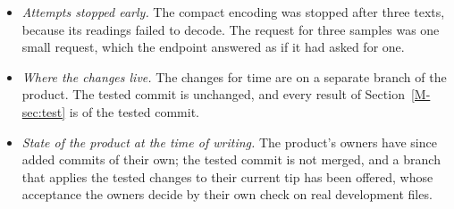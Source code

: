 \begin{itemize}[leftmargin=1.2em,itemsep=1pt]
\item \emph{Attempts stopped early.} The compact encoding was stopped after three texts, because its readings failed to decode. The request for three samples was one small request, which the endpoint answered as if it had asked for one.
\item \emph{Where the changes live.} The changes for time are on a separate branch of the product. The tested commit is unchanged, and every result of Section~\ref{M-sec:test} is of the tested commit.
\item \emph{State of the product at the time of writing.} The product's owners have since added commits of their own; the tested commit is not merged, and a branch that applies the tested changes to their current tip has been offered, whose acceptance the owners decide by their own check on real development files.
\end{itemize}
